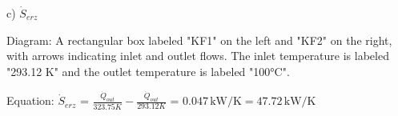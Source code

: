 c) \( \dot{S}_{erz} \)  

Diagram: A rectangular box labeled "KF1" on the left and "KF2" on the right, with arrows indicating inlet and outlet flows. The inlet temperature is labeled "293.12 K" and the outlet temperature is labeled "100°C".  

Equation:  
\( \dot{S}_{erz} \) = \( \frac{\dot{Q}_{out}}{323.75 K} - \frac{\dot{Q}_{out}}{293.12 K} \)  
= \( 0.047 \, \text{kW/K} = 47.72 \, \text{kW/K} \)